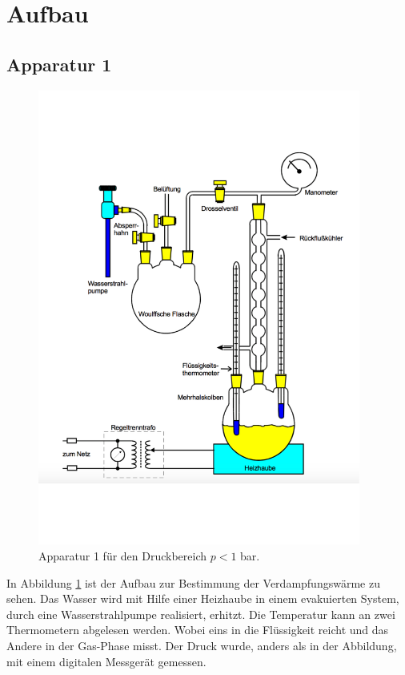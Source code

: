 \section{Aufbau}
\subsection{Apparatur 1}

  \begin{figure}[h!]
    \centering
    \includegraphics[height = 15cm]{Apparatur1.pdf}
    \caption{Apparatur 1 für den Druckbereich $p < 1$ \si{bar}.}
    \label{fig: Apparatur1}
  \end{figure}

\FloatBarrier

In Abbildung \ref{fig: Apparatur1} ist der Aufbau zur Bestimmung der Verdampfungswärme zu sehen.
Das Wasser wird mit Hilfe einer Heizhaube in einem evakuierten System, durch eine Wasserstrahlpumpe
realisiert, erhitzt. Die Temperatur kann
an zwei Thermometern abgelesen werden. Wobei eins in die Flüssigkeit reicht und das Andere in der
Gas-Phase misst. Der Druck wurde, anders als in der Abbildung, mit einem digitalen Messgerät gemessen.

